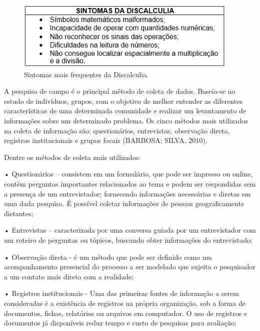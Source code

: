 \documentclass[
	12pt,				%
    oneside,			%
	a4paper,			%
	english,			%
	french,				%
	spanish,			%
	brazil,				%
	]{abntex2}
\begin{document}
\begin{figure} [hbt] 
\label{figura1} 
\caption{Sintomas mais frequentes da Discalculia.}
\includegraphics[width=0.95\textwidth]{tabela.png} %
\end{figure}

A pesquisa de campo é o principal método de coleta de dados. Baseia-se no estudo de indivíduos, grupos, com o objetivo de melhor entender as diferentes características de uma determinada comunidade e realizar um levantamento de informações sobre um determinado problema. Os cinco métodos mais utilizados na coleta de informação são: questionários, entrevistas, observação direta, registros institucionais e grupos focais (BARBOSA; SILVA, 2010).

Dentre os métodos de coleta mais utilizados:

•	Questionários – consistem em um formulário, que pode ser impresso ou online, contém perguntas importantes relacionados ao tema e podem ser respondidas sem a presença de um entrevistador; fornecendo informações necessárias e diretas em uma dada pesquisa. É possível coletar informações de pessoas geograficamente distantes;

•	Entrevistas – caracterizada por uma conversa guiada por um entrevistador com um roteiro de perguntas ou tópicos, buscando obter informações do entrevistado;

•	Observação direta - é um método que pode ser definido como um acompanhamento presencial do processo a ser modelado que sujeita o pesquisador a um contato mais direto com a realidade;

•	Registros institucionais - Uma das primeiras fontes de informação a serem consideradas é a existência de registros na própria organização, sob a forma de documentos, fichas, relatórios ou arquivos em computador. O uso de registros e documentos já disponíveis reduz tempo e custo de pesquisas para avaliação;
\end{document}
